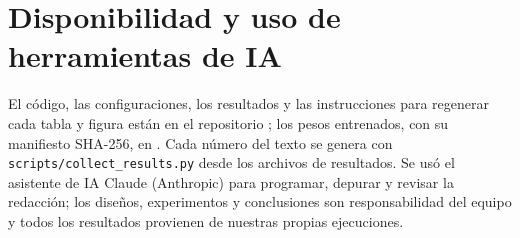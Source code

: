 \section*{Disponibilidad y uso de herramientas de IA}
El código, las configuraciones, los resultados y las instrucciones para regenerar cada tabla
y figura están en el repositorio ; los pesos
entrenados, con su manifiesto SHA-256, en . Cada
número del texto se genera con \texttt{scripts/collect\_results.py} desde los archivos de
resultados. Se usó el asistente de IA Claude (Anthropic) para programar, depurar y revisar
la redacción; los diseños, experimentos y conclusiones son responsabilidad del equipo y todos
los resultados provienen de nuestras propias ejecuciones.
